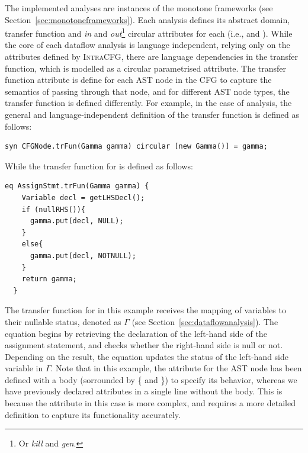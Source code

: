 The implemented analyses are instances of the monotone frameworks (see Section~\ref{sec:monotoneframeworks}).
Each analysis defines its abstract domain, transfer function and \emph{in} and
\emph{out}\footnote{Or \emph{kill} and \emph{gen}.} circular attributes for each  (i.e.,  and  ).
While the core of each dataflow analysis is language independent, relying only on the
attributes defined by \textsc{IntraCFG}, there are language dependencies in the 
transfer function, which is modelled as a circular parametrised attribute.
The transfer function attribute is define for each AST node in the CFG to capture the semantics of passing
through that node, and for different AST node types, the transfer function is defined differently.
For example, in the case of  analysis,
the general and language-independent definition of the transfer function is
defined as follows:
\begin{lstlisting}[language=JastAdd]
  syn CFGNode.trFun(Gamma gamma) circular [new Gamma()] = gamma;
\end{lstlisting}
While the transfer function for  is defined as follows:
\begin{lstlisting}[language=JastAdd]
  eq AssignStmt.trFun(Gamma gamma) {
    Variable decl = getLHSDecl();
    if (nullRHS()){
      gamma.put(decl, NULL);
    }
    else{
      gamma.put(decl, NOTNULL);
    }
    return gamma;
  }
\end{lstlisting}
The transfer function for  in this example receives the 
mapping of variables to their nullable status, denoted as $\Gamma$ 
(see Section~\ref{sec:dataflowanalysis}). The equation begins by retrieving the 
declaration of the left-hand side of the assignment statement, and 
checks whether the right-hand side is null or not. 
Depending on the result, the equation updates the status of the left-hand side 
variable in $\Gamma$.
Note that in this example, the attribute  for the AST node  has been defined with a 
body (sorrounded by \{ and \}) to specify its behavior, whereas we have previously declared attributes in a 
single line without the body. This is because the attribute in this case is more 
complex, and requires a more detailed definition to capture its functionality accurately.










